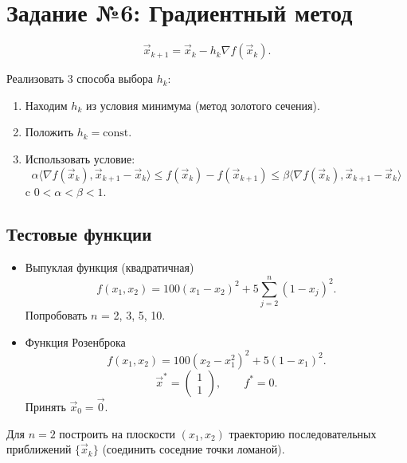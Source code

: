 \documentclass{article}
\begin{document}
\section*{Задание №6: Градиентный метод}

\begin{equation*}
    \vec{x}_{k+1} =
        \vec{x}_k
        - h_k \nabla f (\vec{x}_k).
\end{equation*}

Реализовать 3 способа выбора $h_k$:
\begin{enumerate}
    \item Находим $h_k$ из условия минимума (метод золотого сечения).
    \item Положить $h_k = \text{const}$.
    \item Использовать условие:
    \begin{equation*}
        \alpha \langle \nabla f(\vec{x}_k), \vec{x}_{k+1} - \vec{x}_k \rangle
        \leqslant f(\vec{x}_k) - f(\vec{x}_{k+1})
        \leqslant \beta \langle \nabla f(\vec{x}_k), \vec{x}_{k+1} - \vec{x}_k \rangle
    \end{equation*}
    c $0 < \alpha < \beta < 1$.
\end{enumerate}


\subsection*{Тестовые функции}

\begin{itemize}
    \item{}
        Выпуклая функция (квадратичная)
        \begin{equation*}
            f(x_1, x_2) = 100 \left(x_1 - x_2\right)^2
                          + 5 \sum_{j=2}^{n}\left(1 - x_j\right)^2.
        \end{equation*}
        Попробовать $n$ = 2, 3, 5, 10.
    \item{}
        Функция Розенброка
        \begin{equation*}
            f(x_1, x_2) = 100 \left(x_2 - x_1^2\right)^2
                          + 5\left(1 - x_1\right)^2.
        \end{equation*}
        \begin{equation*}
            \vec{x}^* =
            \begin{pmatrix}1\\1\end{pmatrix}, \qquad f^* = 0.
        \end{equation*}
        Принять $\vec{x}_0 = \vec{0}$.

\end{itemize}

Для $n = 2$ построить на плоскости $(x_1, x_2)$ траекторию
последовательных приближений $\{\vec{x}_k\}$ (соединить соседние
точки ломаной).
\end{document}
